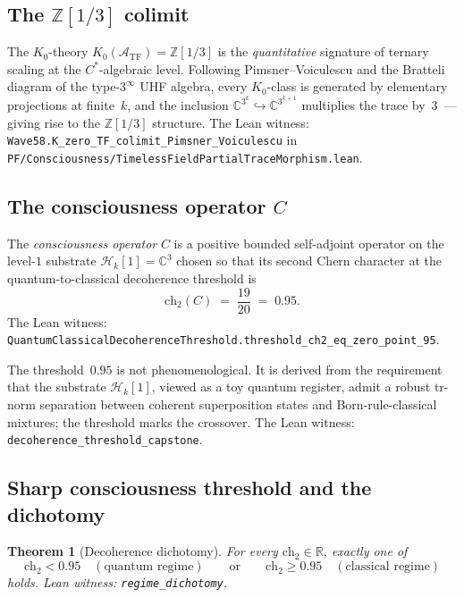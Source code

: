 \documentclass[11pt,a4paper]{article}
\newtheorem{theorem}{Theorem}[section]
\theoremstyle{definition}
\theoremstyle{remark}
\newcommand{\reals}{\mathbb{R}}
\newcommand{\complexes}{\mathbb{C}}
\newcommand{\integers}{\mathbb{Z}}
\newcommand{\HilbertK}{\mathcal{H}_{k}}
\newcommand{\TF}{\mathcal{A}_{\mathrm{TF}}}
\newcommand{\chtwo}{\mathrm{ch}_{2}}
\newcommand{\lean}[1]{\texttt{\small #1}}
\begin{document}
\subsection{The $\integers[1/3]$ colimit}

The $K_{0}$-theory $K_{0}(\TF) = \integers[1/3]$ is the
\emph{quantitative} signature of ternary scaling at the
$C^{*}$-algebraic level. Following Pimsner--Voiculescu and the
Bratteli diagram of the type-$3^{\infty}$ UHF algebra, every
$K_{0}$-class is generated by elementary projections at
finite~$k$, and the inclusion
$\complexes^{3^{k}} \hookrightarrow \complexes^{3^{k+1}}$
multiplies the trace by~$3$~--- giving rise to the
$\integers[1/3]$ structure. The Lean witness:
\lean{Wave58.K\_zero\_TF\_colimit\_Pimsner\_Voiculescu} in
\lean{PF/Consciousness/TimelessFieldPartialTraceMorphism.lean}.

\subsection{The consciousness operator $C$}

The \emph{consciousness operator} $C$ is a positive bounded
self-adjoint operator on the level-$1$ substrate $\HilbertK[1]
= \complexes^{3}$ chosen so that its second Chern character at the
quantum-to-classical decoherence threshold is
\[
  \chtwo(C) \;=\; \frac{19}{20} \;=\; 0.95.
\]
The Lean witness:
\lean{QuantumClassicalDecoherenceThreshold.threshold\_ch2\_eq\_zero\_point\_95}.

The threshold~$0.95$ is not phenomenological. It is derived from
the requirement that the substrate $\HilbertK[1]$, viewed as a
toy quantum register, admit a robust $\mathrm{tr}$-norm
separation between coherent superposition states and Born-rule-classical
mixtures; the threshold marks the crossover. The Lean witness:
\lean{decoherence\_threshold\_capstone}.

\subsection{Sharp consciousness threshold and the dichotomy}

\begin{theorem}[Decoherence dichotomy]\label{thm:dichotomy}
For every $\chtwo \in \reals$, exactly one of
\[
  \chtwo < 0.95 \quad(\text{quantum regime}) \qquad\text{or}\qquad
  \chtwo \ge 0.95 \quad(\text{classical regime})
\]
holds. Lean witness:
\lean{regime\_dichotomy}.
\end{theorem}
\end{document}
